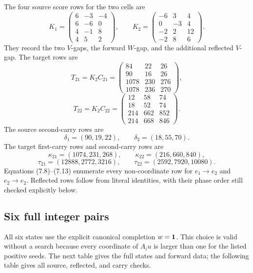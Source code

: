 \documentclass[11pt]{article}
\theoremstyle{definition}
\theoremstyle{remark}
\begin{document}
The four source score rows for the two cells are
\[
 K_1=\begin{pmatrix}
6&-3&-4\\6&-6&0\\4&-1&8\\4&5&2
\end{pmatrix},\qquad
 K_2=\begin{pmatrix}
-6&3&4\\0&-3&4\\-2&2&12\\-2&8&6
\end{pmatrix}.
\tag{7.8}
\]
They record the two \(V\)-gaps, the forward \(W\)-gap, and the additional
reflected \(V\)-gap.  The target rows are
\[
 T_{21}=K_2C_{21}
 =\begin{pmatrix}
84&22&26\\90&16&26\\1078&230&276\\1078&236&270
\end{pmatrix},
\tag{7.9}
\]
\[
 T_{22}=K_2C_{22}
 =\begin{pmatrix}
12&58&74\\18&52&74\\214&662&852\\214&668&846
\end{pmatrix}.
\tag{7.10}
\]
The source second-carry rows are
\[
 \delta_1=(90,19,22),\qquad \delta_2=(18,55,70).
\tag{7.11}
\]
The target first-carry rows and second-carry rows are
\[
 \kappa_{21}=(1074,231,268),\qquad
 \kappa_{22}=(216,660,840),
\tag{7.12}
\]
\[
 \tau_{21}=(12888,2772,3216),\qquad
 \tau_{22}=(2592,7920,10080).
\tag{7.13}
\]
Equations (7.8)--(7.13) enumerate every non-coordinate row for
\(e_1\to e_2\) and \(e_2\to e_2\).  Reflected rows follow from literal
identities, with their phase order still checked explicitly below.

\subsection{Six full integer pairs}

All six states use the explicit canonical completion \(w=\mathbf{1}\).  This
choice is valid without a search because every coordinate of \(A_i u\) is
larger than one for the listed positive seeds.  The next table gives the
full states and forward data; the following table gives all source,
reflected, and carry checks.
\end{document}
